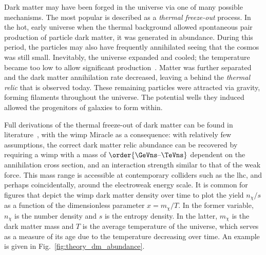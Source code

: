 Dark matter may have been forged in the universe via one of many possible mechanisms. The most popular is described as a \emph{thermal freeze-out} process. In the hot, early universe when the thermal background allowed spontaneous pair production of particle dark matter, it was generated in abundance. During this period, the particles may also have frequently annihilated seeing that the cosmos was still small. Inevitably, the universe expanded and cooled; the temperature became too low to allow significant production~\cite{Baldes:2017gzw}. Matter was further separated and the dark matter annihilation rate decreased, leaving a behind the \emph{thermal relic} that is observed today. These remaining particles were attracted via gravity, forming filaments throughout the universe. The potential wells they induced allowed the progenitors of galaxies to form within.

Full derivations of the thermal freeze-out of dark matter can be found in literature~\cite{cosmic_abundances_stable_particles,Bender:2012gc}, with the \acrshort{wimp} Miracle as a consequence: with relatively few assumptions, the correct dark matter relic abundance can be recovered by requiring a \acrfull{wimp} with a mass of $\order{\text{\GeVns--\TeVns}}$ dependent on the annihilation cross section, and an interaction strength similar to that of the weak force. This mass range is accessible at contemporary colliders such as the \acrshort{lhc}, and perhaps coincidentally, around the electroweak energy scale. It is common for figures that depict the \acrshort{wimp} dark matter density over time to plot the yield $n_{\chi}/s$ as a function of the dimensionless parameter $x = m_{\chi}/T$. In the former variable, $n_{\chi}$ is the number density and $s$ is the entropy density. In the latter, $m_{\chi}$ is the dark matter mass and $T$ is the average temperature of the universe, which serves as a measure of its age due to the temperature decreasing over time. An example is given in Fig.~\ref{fig:theory_dm_abundance}.

